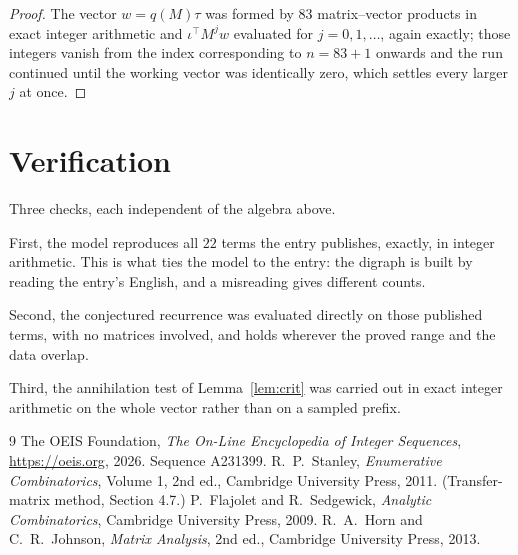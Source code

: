 \documentclass[11pt,a4paper]{article}
\theoremstyle{plain}
\theoremstyle{definition}
\begin{document}
\begin{proof}
The vector $w=q(M)\tau$ was formed by $83$ matrix--vector products in exact integer
arithmetic and $\iota^{\!\top}M^{j}w$ evaluated for $j=0,1,\dots$, again exactly; those
integers vanish from the index corresponding to $n=83+1$ onwards and the run continued
until the working vector was identically zero, which settles every larger $j$ at once.
\end{proof}

\section{Verification}

Three checks, each independent of the algebra above.

First, the model reproduces all $22$ terms the entry publishes, exactly, in integer
arithmetic. This is what ties the model to the entry: the digraph is built by reading the
entry's English, and a misreading gives different counts.

Second, the conjectured recurrence was evaluated directly on those published terms, with no
matrices involved, and holds wherever the proved range and the data overlap.

Third, the annihilation test of Lemma~\ref{lem:crit} was carried out in exact integer
arithmetic on the whole vector rather than on a sampled prefix.

\begin{thebibliography}{9}
 The OEIS Foundation, \emph{The On-Line Encyclopedia of Integer
Sequences}, \url{https://oeis.org}, 2026. Sequence A231399.
 R.~P.~Stanley, \emph{Enumerative Combinatorics}, Volume 1, 2nd ed.,
Cambridge University Press, 2011. (Transfer-matrix method, Section 4.7.)
 P.~Flajolet and R.~Sedgewick, \emph{Analytic Combinatorics}, Cambridge
University Press, 2009.
 R.~A.~Horn and C.~R.~Johnson, \emph{Matrix Analysis}, 2nd ed., Cambridge
University Press, 2013.
\end{thebibliography}
\end{document}

